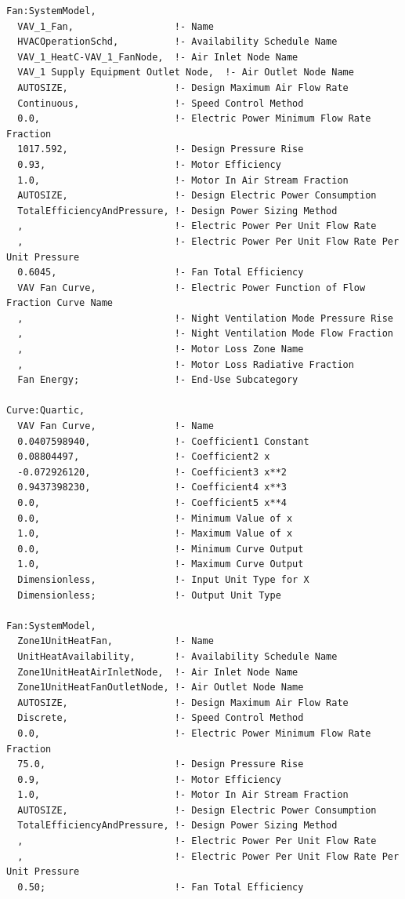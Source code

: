 \begin{lstlisting}
Fan:SystemModel,
  VAV_1_Fan,                  !- Name
  HVACOperationSchd,          !- Availability Schedule Name
  VAV_1_HeatC-VAV_1_FanNode,  !- Air Inlet Node Name
  VAV_1 Supply Equipment Outlet Node,  !- Air Outlet Node Name
  AUTOSIZE,                   !- Design Maximum Air Flow Rate
  Continuous,                 !- Speed Control Method
  0.0,                        !- Electric Power Minimum Flow Rate Fraction
  1017.592,                   !- Design Pressure Rise
  0.93,                       !- Motor Efficiency
  1.0,                        !- Motor In Air Stream Fraction
  AUTOSIZE,                   !- Design Electric Power Consumption
  TotalEfficiencyAndPressure, !- Design Power Sizing Method
  ,                           !- Electric Power Per Unit Flow Rate
  ,                           !- Electric Power Per Unit Flow Rate Per Unit Pressure
  0.6045,                     !- Fan Total Efficiency
  VAV Fan Curve,              !- Electric Power Function of Flow Fraction Curve Name
  ,                           !- Night Ventilation Mode Pressure Rise
  ,                           !- Night Ventilation Mode Flow Fraction
  ,                           !- Motor Loss Zone Name
  ,                           !- Motor Loss Radiative Fraction
  Fan Energy;                 !- End-Use Subcategory

Curve:Quartic,
  VAV Fan Curve,              !- Name
  0.0407598940,               !- Coefficient1 Constant
  0.08804497,                 !- Coefficient2 x
  -0.072926120,               !- Coefficient3 x**2
  0.9437398230,               !- Coefficient4 x**3
  0.0,                        !- Coefficient5 x**4
  0.0,                        !- Minimum Value of x
  1.0,                        !- Maximum Value of x
  0.0,                        !- Minimum Curve Output
  1.0,                        !- Maximum Curve Output
  Dimensionless,              !- Input Unit Type for X
  Dimensionless;              !- Output Unit Type

Fan:SystemModel,
  Zone1UnitHeatFan,           !- Name
  UnitHeatAvailability,       !- Availability Schedule Name
  Zone1UnitHeatAirInletNode,  !- Air Inlet Node Name
  Zone1UnitHeatFanOutletNode, !- Air Outlet Node Name
  AUTOSIZE,                   !- Design Maximum Air Flow Rate
  Discrete,                   !- Speed Control Method
  0.0,                        !- Electric Power Minimum Flow Rate Fraction
  75.0,                       !- Design Pressure Rise
  0.9,                        !- Motor Efficiency
  1.0,                        !- Motor In Air Stream Fraction
  AUTOSIZE,                   !- Design Electric Power Consumption
  TotalEfficiencyAndPressure, !- Design Power Sizing Method
  ,                           !- Electric Power Per Unit Flow Rate
  ,                           !- Electric Power Per Unit Flow Rate Per Unit Pressure
  0.50;                       !- Fan Total Efficiency


\end{lstlisting}
